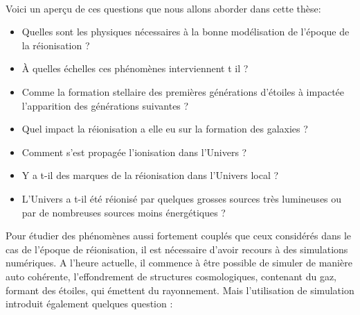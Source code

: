%


\paragraph{}
Voici un aperçu de ces questions que nous allons aborder dans cette thèse: 

\begin{itemize}
\item Quelles sont les physiques nécessaires à la bonne modélisation de l'époque de la réionisation ?
\item À quelles échelles ces phénomènes interviennent t il ?
\item Comme la formation stellaire des premières générations d'étoiles à impactée l'apparition des générations suivantes ? %
\item Quel impact la réionisation a elle eu sur la formation des galaxies ?
\item Comment s'est propagée l'ionisation dans l'Univers ?
\item Y a t-il des marques de la réionisation dans l'Univers local ?
\item L'Univers a t-il été réionisé par quelques grosses sources très lumineuses ou par de nombreuses sources moins énergétiques ?
\end{itemize}

Pour étudier des phénomènes aussi fortement couplés que ceux considérés dans le cas de l'époque de réionisation, il est nécessaire d'avoir recours à des simulations numériques. 
A l'heure actuelle, il commence à être possible de simuler de manière auto cohérente, l'effondrement de structures cosmologiques, contenant du gaz, formant des étoiles, qui émettent du rayonnement.
Mais l'utilisation de simulation introduit également quelques question : 

